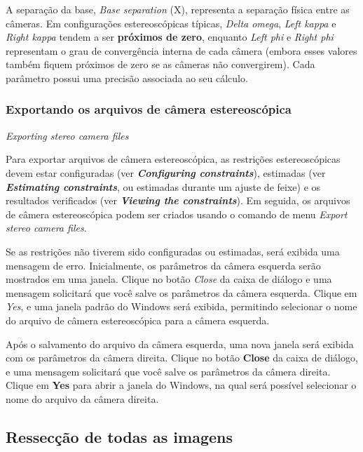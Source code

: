 \documentclass[
  12pt,
  letterpaper,
  DIV=11,
  numbers=noendperiod]{scrreprt}
\begin{document}
A separação da base, \emph{Base separation} (X), representa a separação
física entre as câmeras. Em configurações estereoscópicas típicas,
\emph{Delta omega}, \emph{Left kappa} e \emph{Right kappa} tendem a ser
\textbf{próximos de zero}, enquanto \emph{Left phi} e \emph{Right phi}
representam o grau de convergência interna de cada câmera (embora esses
valores também fiquem próximos de zero se as câmeras não convergirem).
Cada parâmetro possui uma precisão associada ao seu cálculo.

\subsubsection{\texorpdfstring{\textbf{Exportando os arquivos de câmera
estereoscópica}}{Exportando os arquivos de câmera estereoscópica}}\label{sec-exp.stereo.files}

\emph{Exporting stereo camera files}

Para exportar arquivos de câmera estereoscópica, as restrições
estereoscópicas devem estar configuradas (ver \textbf{\emph{Configuring
constraints}}), estimadas (ver \textbf{\emph{Estimating constraints}},
ou estimadas durante um ajuste de feixe) e os resultados verificados
(ver \textbf{\emph{Viewing the constraints}}). Em seguida, os arquivos
de câmera estereoscópica podem ser criados usando o comando de menu
\emph{Export stereo camera files}.

Se as restrições não tiverem sido configuradas ou estimadas, será
exibida uma mensagem de erro. Inicialmente, os parâmetros da câmera
esquerda serão mostrados em uma janela. Clique no botão \emph{Close} da
caixa de diálogo e uma mensagem solicitará que você salve os parâmetros
da câmera esquerda. Clique em \emph{Yes}, e uma janela padrão do Windows
será exibida, permitindo selecionar o nome do arquivo de câmera
estereoscópica para a câmera esquerda.

Após o salvamento do arquivo da câmera esquerda, uma nova janela será
exibida com os parâmetros da câmera direita. Clique no botão
\textbf{Close} da caixa de diálogo, e uma mensagem solicitará que você
salve os parâmetros da câmera direita. Clique em \textbf{Yes} para abrir
a janela do Windows, na qual será possível selecionar o nome do arquivo
da câmera direita.

\subsection{Ressecção de todas as
imagens}\label{ressecuxe7uxe3o-de-todas-as-imagens}
\end{document}
